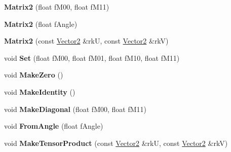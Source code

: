 \begin{DoxyCompactItemize}
\item 
{\bfseries Matrix2} (float f\+M00, float f\+M11)\hypertarget{class_i_dream_sky_1_1_matrix2_acd2cd414f0468ce8d692d0b7c1108b8f}{}\label{class_i_dream_sky_1_1_matrix2_acd2cd414f0468ce8d692d0b7c1108b8f}

\item 
{\bfseries Matrix2} (float f\+Angle)\hypertarget{class_i_dream_sky_1_1_matrix2_a81ce001af50e812f6852eeef8e0cc249}{}\label{class_i_dream_sky_1_1_matrix2_a81ce001af50e812f6852eeef8e0cc249}

\item 
{\bfseries Matrix2} (const \hyperlink{class_i_dream_sky_1_1_vector2}{Vector2} \&rkU, const \hyperlink{class_i_dream_sky_1_1_vector2}{Vector2} \&rkV)\hypertarget{class_i_dream_sky_1_1_matrix2_a2f93bdb41aaebc0c87c125c2b0285f82}{}\label{class_i_dream_sky_1_1_matrix2_a2f93bdb41aaebc0c87c125c2b0285f82}

\item 
void {\bfseries Set} (float f\+M00, float f\+M01, float f\+M10, float f\+M11)\hypertarget{class_i_dream_sky_1_1_matrix2_a7e1f86bfd82308b20621ee4e39b8194d}{}\label{class_i_dream_sky_1_1_matrix2_a7e1f86bfd82308b20621ee4e39b8194d}

\item 
void {\bfseries Make\+Zero} ()\hypertarget{class_i_dream_sky_1_1_matrix2_aedbe2b41f680634f2baad786ca8503b4}{}\label{class_i_dream_sky_1_1_matrix2_aedbe2b41f680634f2baad786ca8503b4}

\item 
void {\bfseries Make\+Identity} ()\hypertarget{class_i_dream_sky_1_1_matrix2_a680a1823681841616bf42ed201820860}{}\label{class_i_dream_sky_1_1_matrix2_a680a1823681841616bf42ed201820860}

\item 
void {\bfseries Make\+Diagonal} (float f\+M00, float f\+M11)\hypertarget{class_i_dream_sky_1_1_matrix2_a16b3d0b8dcc379f4c9c1dbb567d4b4f9}{}\label{class_i_dream_sky_1_1_matrix2_a16b3d0b8dcc379f4c9c1dbb567d4b4f9}

\item 
void {\bfseries From\+Angle} (float f\+Angle)\hypertarget{class_i_dream_sky_1_1_matrix2_a0c009a75446358d1d9b4ca52c6ff624a}{}\label{class_i_dream_sky_1_1_matrix2_a0c009a75446358d1d9b4ca52c6ff624a}

\item 
void {\bfseries Make\+Tensor\+Product} (const \hyperlink{class_i_dream_sky_1_1_vector2}{Vector2} \&rkU, const \hyperlink{class_i_dream_sky_1_1_vector2}{Vector2} \&rkV)\hypertarget{class_i_dream_sky_1_1_matrix2_a325bf6e4cfca04666ba2b89d147a8d42}{}\label{class_i_dream_sky_1_1_matrix2_a325bf6e4cfca04666ba2b89d147a8d42}


\end{DoxyCompactItemize}
